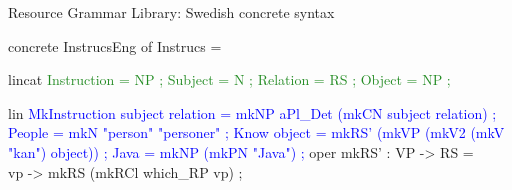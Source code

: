 \begin{frame}[fragile]{Resource Grammar Library: Swedish concrete syntax}
\begin{semiverbatim}
concrete InstrucsEng of Instrucs = {
  lincat\textcolor{ForestGreen}{
    Instruction = \textcolor{Type}{NP} ;
    Subject = \textcolor{Type}{N} ;
    Relation = \textcolor{Type}{RS} ;
    Object = \textcolor{Type}{NP} ;}

  lin\textcolor{Blue}{
   MkInstruction subject relation = 
                    mkNP aPl_Det (mkCN subject relation) ;
   People = mkN \textcolor{String}{"person" "personer"} ;
   Know object = mkRS' (mkVP (mkV2 (mkV \textcolor{String}{"kan"}) object)) ;
   Java = mkNP (mkPN \textcolor{String}{"Java"}) ; }
  oper
     mkRS' : \textcolor{Type}{VP} -> \textcolor{Type}{RS} = \\vp -> mkRS (mkRCl which_RP vp) ;
}
\end{semiverbatim}
\end{frame}

\begin{frame}{}
\end{frame}

